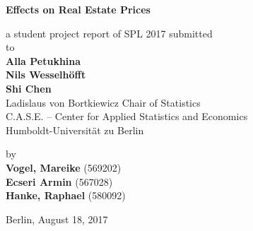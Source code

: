 \begin{center}
    {\Large{\bf Effects on Real Estate Prices}} \vspace{0.5cm}


    {\normalsize a student project report of SPL 2017   submitted\\\vspace{0.5cm}
    to}\\\vspace{0.5cm}
    {\normalsize{\bf Alla Petukhina \\ Nils Wesselhöfft \\ Shi Chen}} \\\vspace{0.5cm}
    {\normalsize Ladislaus von Bortkiewicz Chair of Statistics\\ C.A.S.E. – Center for Applied Statistics and Economics\\ Humboldt-Universität zu Berlin } \vspace{1cm}


    {\normalsize by \\\vspace{0.5cm}
    {\textbf{Vogel, Mareike} (569202)\\ \textbf{Ecseri Armin} (567028) \\ \textbf{Hanke, Raphael} (580092)} \\
    } \vspace{1cm}

    {\normalsize Berlin, August 18, 2017}

\end{center}

